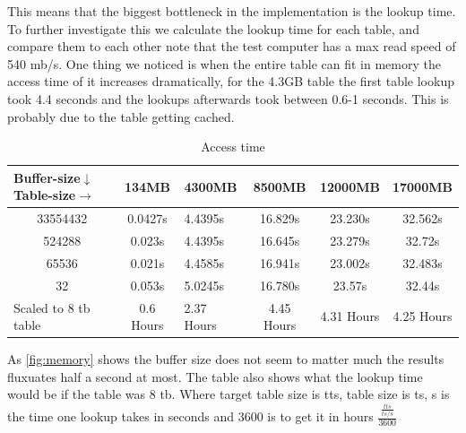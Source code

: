 This means that the biggest bottleneck in the implementation is the lookup time. To further investigate this we calculate the lookup time for each table, and compare them to each other note that the test computer has a max read speed of 540 mb/s. One thing we noticed is when the entire table can fit in memory the access time of it increases dramatically, for the 4.3GB table the first table lookup took 4.4 seconds and the lookups afterwards took between 0.6-1 seconds. This is probably due to the table getting cached.
\begin{table}[h]
\centering
\caption{Access time}
\label{tab:memory}
\begin{tabular}{|c|clccc}
\hline
\multicolumn{1}{|l|}{Buffer-size$\downarrow$ Table-size$\rightarrow$}& \multicolumn{1}{c|}{134MB} & \multicolumn{1}{l|}{4300MB} & \multicolumn{1}{c|}{8500MB} & \multicolumn{1}{c|}{12000MB} & \multicolumn{1}{l|}{17000MB} \\ \hline
33554432                                     & 0.0427s                    & 4.4395s                     & 16.829s                     & 23.230s                      & 32.562s                      \\ \cline{1-1}
524288                                       & 0.023s                     & 4.4395s                     & 16.645s                     & 23.279s                      & 32.72s                       \\ \cline{1-1}
65536                                        & 0.021s                     & 4.4585s                     & 16.941s                     & 23.002s                      & 32.483s                      \\ \cline{1-1}
32                                           & 0.053s                     & 5.0245s                     & 16.780s                     & 23.57s                       & 32.44s                       \\ \cline{1-1}
\multicolumn{1}{|l|}{Scaled to 8 tb table}   & 0.6 Hours                  & 2.37 Hours                  & 4.45 Hours                   & 4.31 Hours                   & 4.25 Hours                   \\ \cline{1-1}
\end{tabular}
\end{table}
As \ref{fig:memory} shows the buffer size does not seem to matter much the results fluxuates half a second at most.
The table also shows what the lookup time would be if the table was 8 tb. Where target table size is tts, table size is ts, s is the time one lookup takes in seconds and 3600 is to get it in hours $\frac{\frac{tts}{ts/s}}{3600}$
